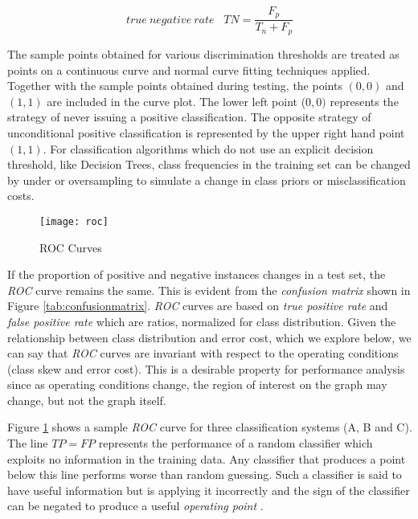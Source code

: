 \documentclass[10pt]{unbthesis}
\begin{document}
\begin{equation}
\label{equ:falsepositiverate}
true\:negative\:rate\;\;\;TN = \frac{F_p}{T_n + F_p}
\end{equation}

The sample points obtained for various
discrimination thresholds are treated as points on a continuous curve
and normal curve fitting techniques applied. Together with the sample
points obtained during testing, the points \((0,0)\) and \((1,1)\) are
included in the curve plot. The lower left point (\(0,0)\) represents
the strategy of never issuing a positive classification. The opposite
strategy of unconditional positive classification is represented by the
upper right hand point \((1,1)\). For classification algorithms which
do not use an explicit decision threshold, like Decision Trees, class
frequencies in the training set can be changed by under or
oversampling to simulate a change in class priors or misclassification
costs. 

\begin{figure}
  \begin{center}
    \texttt{[image: roc]}
  \end{center}
  \caption{ROC Curves}
  \label{fig:roc}
\end{figure} 

If the proportion of positive and negative instances changes in a test
set, the \textit{ROC} curve remains the same. This is evident from the
\textit{confusion matrix} shown in Figure
\ref{tab:confusionmatrix}. \textit{ROC} curves are based on
\textit{true positive rate} and \textit{false positive rate} which are
ratios, normalized for class distribution. Given the relationship
between class distribution and error cost, which we explore below, we
can say that \textit{ROC} curves are invariant with respect to the
operating conditions (class skew and error cost). This is a desirable
property for performance analysis since as operating conditions
change, the region of interest on the graph may change, but not the
graph itself.

Figure \ref{fig:roc} shows a sample
\textit{ROC} curve for three classification systems (A, B and C). The
line \(TP=FP\) represents the performance of a random
classifier which exploits no information in the training data. Any
classifier that produces a point below this line performs worse than
random guessing. Such a classifier is said to have useful information
but is applying it incorrectly and the sign of the classifier can be
negated to produce a useful \textit{operating point} \cite{RefWorks:60}.
\end{document}
